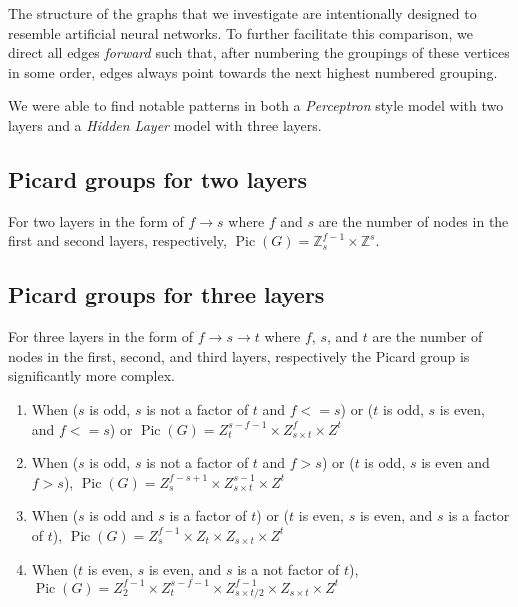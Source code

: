 \documentclass[11pt,reqno]{amsart}
\DeclareMathOperator{\Pic}{Pic}
\theoremstyle{definition}
\theoremstyle{plain}
\begin{document}
	The structure of the graphs that we investigate are intentionally designed to resemble artificial neural networks.
	To further facilitate this comparison, we direct all edges \textit{forward} such that, after numbering the groupings
	of these vertices in some order, edges always point towards the next highest numbered grouping.

	We were able to find notable patterns in both a \textit{Perceptron} style model with two layers and a
	\textit{Hidden Layer} model with three layers.

	\subsection{Picard groups for two layers}
		For two layers in the form of $f \rightarrow s$ where $f$ and $s$ are the number of nodes in the first and
		second layers, respectively, $\Pic(G) = \mathbb{Z}_{s}^{f-1} \times \mathbb{Z}^s$.

	\subsection{Picard groups for three layers}
		For three layers in the form of $f \rightarrow s \rightarrow t$ where $f$, $s$, and $t$ are the number of nodes
		in the first, second, and third layers, respectively the Picard group is significantly more complex.

		\begin{enumerate}
			\item When ($s$ is odd, $s$ is not a factor of $t$ and $f <= s$) or
					($t$ is odd, $s$ is even, and $f <= s$) or
				$\Pic(G) = Z_{t}^{s-f-1} \times Z_{s \times t}^{f} \times Z^t$

			\item When ($s$ is odd, $s$ is not a factor of $t$ and $f > s$) or
					($t$ is odd, $s$ is even and $f > s$),
				$\Pic(G) = Z_{s}^{f-s+1} \times Z_{s \times t}^{s-1} \times Z^t$

			\item When ($s$ is odd and $s$ is a factor of $t$) or ($t$ is even, $s$ is even, and $s$ is a factor of $t$),
				$\Pic(G) = Z_{s}^{f-1} \times Z_{t} \times Z_{s \times t} \times Z^t$

			\item When ($t$ is even, $s$ is even, and $s$ is a not factor of $t$),
				$\Pic(G) = Z_{2}^{f-1} \times Z_{t}^{s-f-1} \times Z_{s \times t/2}^{f-1} \times Z_{s \times t} \times Z^t$
		\end{enumerate}
\end{document}
